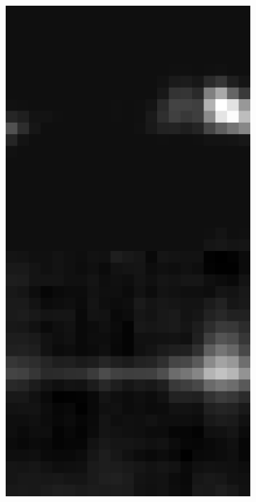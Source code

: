 \documentclass[10pt, letter]{article}
\begin{document}
\begin{figure}[h!]
				~
				\begin{subfigure}[t]{0.18\textwidth}
					\centering
					\includegraphics[width=\textwidth]{figures/inv2}
				\end{subfigure}	
				~
				\begin{subfigure}[t]{0.18\textwidth}

\end{subfigure}
\end{figure}
\end{document}
